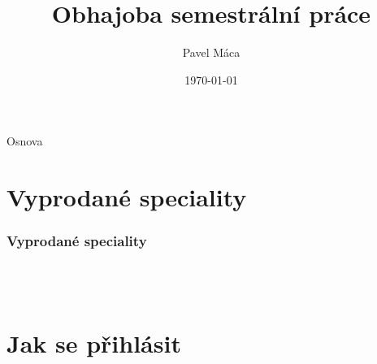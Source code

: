 \documentclass[slidestop]{beamer}
\begin{document}
\title{Obhajoba semestrální práce}
\author{Pavel Máca}
\date{\today}
\begin{frame}
\titlepage
\end{frame}
\begin{frame}{Osnova}
\tableofcontents
\end{frame}
\section{Vyprodané speciality}
\begin{frame}
\frametitle{Vyprodané speciality}
\begin{figure}[h] %
\begin{center}
\\~\\
\end{center}
\end{figure}
\end{frame}
\section{Jak se přihlásit}
\end{document}
